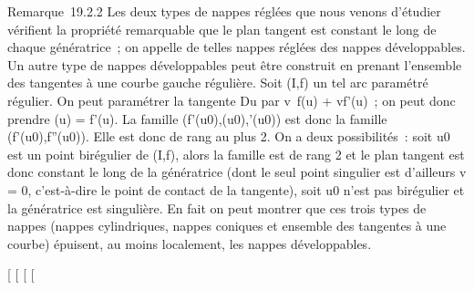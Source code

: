 Remarque~19.2.2 Les deux types de nappes réglées que nous venons
d'étudier vérifient la propriété remarquable que le plan tangent est
constant le long de chaque génératrice~; on appelle de telles nappes
réglées des nappes développables. Un autre type de nappes développables
peut être construit en prenant l'ensemble des tangentes à une courbe
gauche régulière. Soit (I,f) un tel arc paramétré régulier. On peut
paramétrer la tangente Du par
v\mapsto~f(u) + vf'(u)~; on peut donc prendre
\vecg(u) = f'(u). La famille
(f'(u0),\vecg(u0),\vecg'(u0))
est donc la famille (f'(u0),f''(u0)). Elle est donc
de rang au plus 2. On a deux possibilités~: soit u0 est un
point birégulier de (I,f), alors la famille est de rang 2 et le plan
tangent est donc constant le long de la génératrice (dont le seul point
singulier est d'ailleurs v = 0, c'est-à-dire le point de contact de la
tangente), soit u0 n'est pas birégulier et la génératrice est
singulière. En fait on peut montrer que ces trois types de nappes
(nappes cylindriques, nappes coniques et ensemble des tangentes à une
courbe) épuisent, au moins localement, les nappes développables.

{[}
{[}
{[}
{[}
